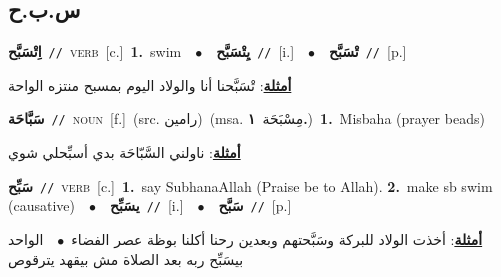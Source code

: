 \documentclass[10pt,a4paper,twoside]{article} %
\begin{document}
\begin{multicols}{2}
{{{\vspace{-3mm}
\subsection*{\color{blue}\foreignlanguage{arabic}{س.ب.ح}\color{blue}{}} 

{\setlength\topsep{0pt}\textbf{\foreignlanguage{arabic}{اِتْسَبَّح}}\ {\color{gray}\texttt{//}\color{black}}\ \textsc{verb}\ [c.]\ \textbf{1.}~swim\ \ $\bullet$\ \ \setlength\topsep{0pt}\textbf{\foreignlanguage{arabic}{يِتْسَبَّح}}\ {\color{gray}\texttt{//}\color{black}}\ [i.]\ \ $\bullet$\ \ \setlength\topsep{0pt}\textbf{\foreignlanguage{arabic}{تْسَبَّح}}\ {\color{gray}\texttt{//}\color{black}}\ [p.]\  \begin{flushright}\color{gray}\foreignlanguage{arabic}{\textbf{\underline{\foreignlanguage{arabic}{أمثلة}}}: تْسَبَّحنا أنا والولاد اليوم بمسبح منتزه الواحة}\end{flushright}\color{black}} \vspace{2mm}

{\setlength\topsep{0pt}\textbf{\foreignlanguage{arabic}{سَبَّاحَة}}\ {\color{gray}\texttt{//}\color{black}}\ \textsc{noun}\ [f.]\ (src. \color{gray}\foreignlanguage{arabic}{رامين}\color{black})\ \color{gray}(msa. \foreignlanguage{arabic}{مِسْبَحَة}~\foreignlanguage{arabic}{\textbf{١.}})\color{black}\ \textbf{1.}~Misbaha (prayer beads)\  \begin{flushright}\color{gray}\foreignlanguage{arabic}{\textbf{\underline{\foreignlanguage{arabic}{أمثلة}}}: ناولني السَّبّاحَة بدي أسبِّحلي شوي}\end{flushright}\color{black}} \vspace{2mm}

{\setlength\topsep{0pt}\textbf{\foreignlanguage{arabic}{سَبِّح}}\ {\color{gray}\texttt{//}\color{black}}\ \textsc{verb}\ [c.]\ \textbf{1.}~say SubhanaAllah (Praise be to Allah).  \textbf{2.}~make sb swim (causative)\ \ $\bullet$\ \ \setlength\topsep{0pt}\textbf{\foreignlanguage{arabic}{يسَبِّح}}\ {\color{gray}\texttt{//}\color{black}}\ [i.]\ \ $\bullet$\ \ \setlength\topsep{0pt}\textbf{\foreignlanguage{arabic}{سَبَّح}}\ {\color{gray}\texttt{//}\color{black}}\ [p.]\  \begin{flushright}\color{gray}\foreignlanguage{arabic}{\textbf{\underline{\foreignlanguage{arabic}{أمثلة}}}: أخذت الولاد للبركة وسَبَّحتهم وبعدين رحنا أكلنا بوظة عصر الفضاء\ $\bullet$\ \  الواحد بيسَبِّح ربه بعد الصلاة مش بيقهد يترقوص}\end{flushright}\color{black}} \vspace{2mm}

}}}
\end{multicols}
\end{document}
